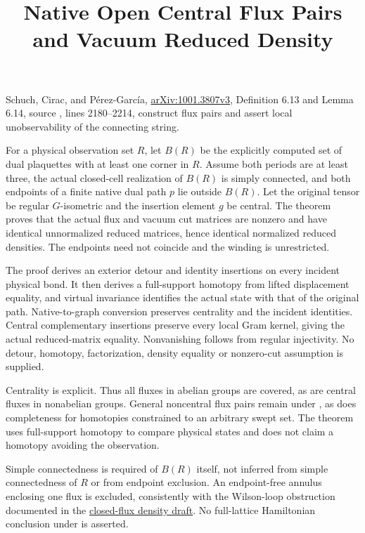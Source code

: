 \documentclass{article}
\title{Native Open Central Flux Pairs and Vacuum Reduced Density}
\author{}
\date{}
\begin{document}
\maketitle
{}

Schuch, Cirac, and P\'erez-Garc\'ia,
\href{https://arxiv.org/abs/1001.3807v3}{arXiv:1001.3807v3},
Definition 6.13 and Lemma 6.14, source
, lines 2180--2214,
construct flux pairs and assert local unobservability of the connecting string.

For a physical observation set $R$, let $B(R)$ be the explicitly computed
set of dual plaquettes with at least one corner in $R$. Assume both periods
are at least three, the actual closed-cell realization of $B(R)$ is simply
connected, and both endpoints of a finite native dual path $p$ lie outside
$B(R)$. Let the original tensor be regular $G$-isometric and the insertion
element $g$ be central. The theorem
proves that the actual flux and vacuum cut matrices are nonzero and have
identical unnormalized reduced matrices, hence identical normalized reduced
densities. The endpoints need not coincide and the winding is unrestricted.

The proof derives an exterior detour and identity insertions on every
incident physical bond. It then derives a full-support homotopy from
lifted displacement equality, and virtual invariance identifies the actual
state with that of the original path. Native-to-graph conversion preserves
centrality and the incident identities. Central complementary insertions
preserve every local Gram kernel, giving the actual reduced-matrix equality.
Nonvanishing follows from regular injectivity. No detour, homotopy,
factorization, density equality or nonzero-cut assumption is supplied.

Centrality is explicit. Thus all fluxes in abelian groups are covered,
as are central fluxes in nonabelian groups. General noncentral flux pairs
remain under , as does completeness for homotopies constrained
to an arbitrary swept set. The theorem uses full-support homotopy to compare
physical states and does not claim a homotopy avoiding the observation.

Simple connectedness is required of $B(R)$ itself, not inferred from simple
connectedness of $R$ or from endpoint exclusion. An endpoint-free annulus
enclosing one flux is excluded, consistently with the Wilson-loop
obstruction documented in the
\href{https://github.com/LionSR/TNLean/pull/10624}{closed-flux density draft}.
No full-lattice Hamiltonian conclusion under  is asserted.
\end{document}
